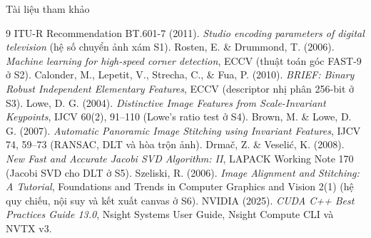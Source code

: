 \documentclass[aspectratio=169]{beamer}
\begin{document}
\begin{frame}{Tài liệu tham khảo}
\scriptsize
\begin{thebibliography}{9}
 ITU-R Recommendation BT.601-7 (2011). \emph{Studio encoding parameters of digital television} (hệ số chuyển ảnh xám S1).
 Rosten, E. \& Drummond, T. (2006). \emph{Machine learning for high-speed corner detection}, ECCV (thuật toán góc FAST-9 ở S2).
 Calonder, M., Lepetit, V., Strecha, C., \& Fua, P. (2010). \emph{BRIEF: Binary Robust Independent Elementary Features}, ECCV (descriptor nhị phân 256-bit ở S3).
 Lowe, D. G. (2004). \emph{Distinctive Image Features from Scale-Invariant Keypoints}, IJCV 60(2), 91--110 (Lowe's ratio test ở S4).
 Brown, M. \& Lowe, D. G. (2007). \emph{Automatic Panoramic Image Stitching using Invariant Features}, IJCV 74, 59--73 (RANSAC, DLT và hòa trộn ảnh).
 Drmač, Z. \& Veselić, K. (2008). \emph{New Fast and Accurate Jacobi SVD Algorithm: II}, LAPACK Working Note 170 (Jacobi SVD cho DLT ở S5).
 Szeliski, R. (2006). \emph{Image Alignment and Stitching: A Tutorial}, Foundations and Trends in Computer Graphics and Vision 2(1) (hệ quy chiếu, nội suy và kết xuất canvas ở S6).
 NVIDIA (2025). \emph{CUDA C++ Best Practices Guide 13.0}, Nsight Systems User Guide, Nsight Compute CLI và NVTX v3.
\end{thebibliography}
\end{frame}
\end{document}
